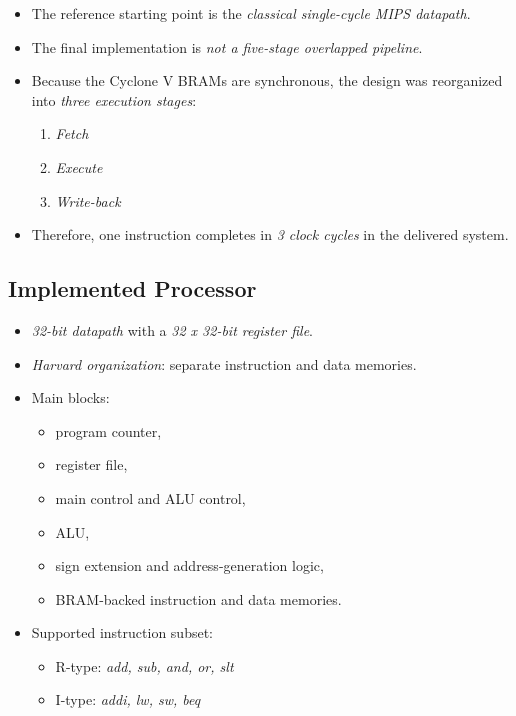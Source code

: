 \documentclass[11pt]{article}
\begin{document}
\begin{itemize}
\item The reference starting point is the \emph{classical single-cycle MIPS datapath}.
\item The final implementation is \emph{not a five-stage overlapped pipeline}.
\item Because the Cyclone V BRAMs are synchronous, the design was reorganized into \emph{three execution stages}:
\begin{enumerate}
\item \emph{Fetch}
\item \emph{Execute}
\item \emph{Write-back}
\end{enumerate}
\item Therefore, one instruction completes in \emph{3 clock cycles} in the delivered system.
\end{itemize}
\subsection*{Implemented Processor}
\label{sec:org9f08933}
\begin{itemize}
\item \emph{32-bit datapath} with a \emph{32 x 32-bit register file}.
\item \emph{Harvard organization}: separate instruction and data memories.
\item Main blocks:
\begin{itemize}
\item program counter,
\item register file,
\item main control and ALU control,
\item ALU,
\item sign extension and address-generation logic,
\item BRAM-backed instruction and data memories.
\end{itemize}
\item Supported instruction subset:
\begin{itemize}
\item R-type: \emph{add, sub, and, or, slt}
\item I-type: \emph{addi, lw, sw, beq}
\end{itemize}
\end{itemize}
\end{document}
